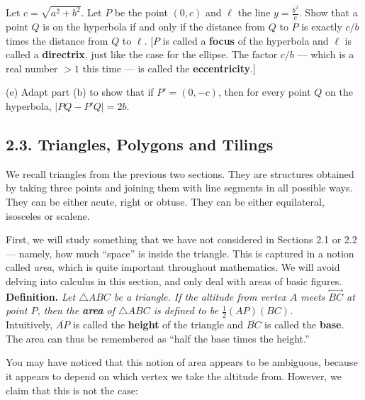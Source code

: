\documentclass[leqno]{book}
\begin{document}
\begin{enumerate}
Let $c=\sqrt{a^2+b^2}$.  Let $P$ be the point $(0,c)$ and $\ell$ the line $y=\frac{b^2}c$.  Show that a point $Q$ is on the hyperbola if and only if the distance from $Q$ to $P$ is exactly $c/b$ times the distance from $Q$ to $\ell$.  [$P$ is called a \textbf{focus} of the hyperbola and $\ell$ is called a \textbf{directrix}, just like the case for the ellipse.  The factor $c/b$ \---- which is a real number $>1$ this time \---- is called the \textbf{eccentricity}.]

(e) Adapt part (b) to show that if $P'=(0,-c)$, then for every point $Q$ on the hyperbola, $|PQ-P'Q|=2b$.
\end{enumerate}

\subsection*{2.3. Triangles, Polygons and Tilings}
We recall triangles from the previous two sections.  They are structures obtained by taking three points and joining them with line segments in all possible ways.  They can be either acute, right or obtuse.  They can be either equilateral, isosceles or scalene.

First, we will study something that we have not considered in Sections 2.1 or 2.2 \---- namely, how much ``space'' is inside the triangle.  This is captured in a notion called \emph{area}, which is quite important throughout mathematics.  We will avoid delving into calculus in this section, and only deal with areas of basic figures.\\

\noindent\textbf{Definition.} \emph{Let $\triangle ABC$ be a triangle.  If the altitude from vertex $A$ meets $\overset{\longleftrightarrow}{BC}$ at point $P$, then the \textbf{area} of $\triangle ABC$ is defined to be $\frac 12(AP)(BC)$.}\\

\noindent Intuitively, $\overline{AP}$ is called the \textbf{height} of the triangle and $\overline{BC}$ is called the \textbf{base}.  The area can thus be remembered as ``half the base times the height.''

You may have noticed that this notion of area appears to be ambiguous, because it appears to depend on which vertex we take the altitude from.  However, we claim that this is not the case:\\
\end{document}
